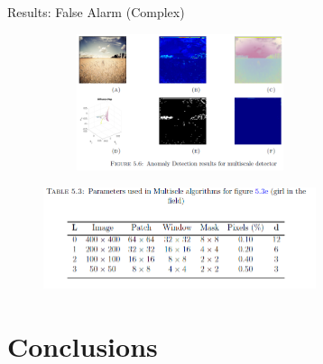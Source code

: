 \documentclass{beamer}
\theoremstyle{plain}
\theoremstyle{definition}
\theoremstyle{plain}
\theoremstyle{plain}
\begin{document}
\begin{frame}{Results: False Alarm (Complex)}

\begin{figure}[ht]
\begin{center}
\includegraphics[width=8cm, height =4cm]{./figures/R_3.png}
\label{algo}
\end{center}
\end{figure}
\begin{figure}[ht]
\begin{center}
\includegraphics[width=8cm, height =3cm]{./figures/R_4.png}
\label{algo}
\end{center}
\end{figure}

\end{frame}
\section{Conclusions}
\end{document}
